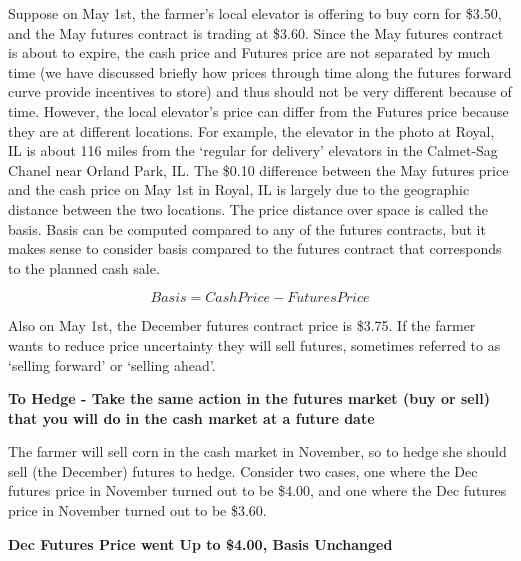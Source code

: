 \documentclass[
]{book}
\begin{document}
Suppose on May 1st, the farmer's local elevator is offering to buy corn for \$3.50, and the May futures contract is trading at \$3.60. Since the May futures contract is about to expire, the cash price and Futures price are not separated by much time (we have discussed briefly how prices through time along the futures forward curve provide incentives to store) and thus should not be very different because of time. However, the local elevator's price can differ from the Futures price because they are at different locations. For example, the elevator in the photo at Royal, IL is about 116 miles from the `regular for delivery' elevators in the Calmet-Sag Chanel near Orland Park, IL. The \$0.10 difference between the May futures price and the cash price on May 1st in Royal, IL is largely due to the geographic distance between the two locations. The price distance over space is called the basis. Basis can be computed compared to any of the futures contracts, but it makes sense to consider basis compared to the futures contract that corresponds to the planned cash sale.

\[Basis = Cash Price - Futures Price\]

Also on May 1st, the December futures contract price is \$3.75. If the farmer wants to reduce price uncertainty they will sell futures, sometimes referred to as `selling forward' or `selling ahead'.

\textbf{To Hedge - Take the same action in the futures market (buy or sell) that you will do in the cash market at a future date}

The farmer will sell corn in the cash market in November, so to hedge she should sell (the December) futures to hedge. Consider two cases, one where the Dec futures price in November turned out to be \$4.00, and one where the Dec futures price in November turned out to be \$3.60.

\textbf{Dec Futures Price went Up to \$4.00, Basis Unchanged}
\end{document}
